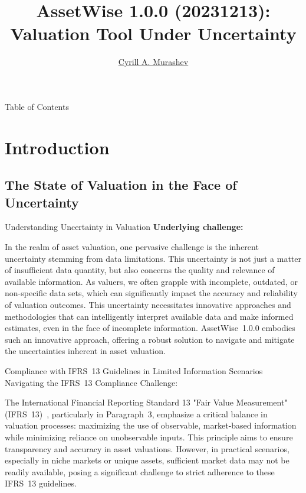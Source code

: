 \documentclass{beamer}
\title{AssetWise 1.0.0 (20231213): Valuation Tool Under Uncertainty}
\author{\href{https://github.com/Kirill-Murashev}{Cyrill A. Murashev}}
\institute{\href{https//sovconsult.tech}{Sovconsult DOO}, \href{https://en.wikipedia.org/wiki/Herceg_Novi}{Herzeg Novi}}
\begin{document}
	
\begin{frame}[plain]
    \maketitle
\end{frame}

\begin{frame}[allowframebreaks]{Table of Contents}
	\tableofcontents
\end{frame}

\section{Introduction}

\subsection{The State of Valuation in the Face of Uncertainty}

\begin{frame}{Understanding Uncertainty in Valuation}
	\textbf{Underlying challenge:}
	
	In the realm of asset valuation, one pervasive challenge is the inherent uncertainty stemming from data limitations. This uncertainty is not just a matter of insufficient data quantity, but also concerns the quality and relevance of available information. As valuers, we often grapple with incomplete, outdated, or non-specific data sets, which can significantly impact the accuracy and reliability of valuation outcomes. This uncertainty necessitates innovative approaches and methodologies that can intelligently interpret available data and make informed estimates, even in the face of incomplete information. AssetWise~1.0.0 embodies such an innovative approach, offering a robust solution to navigate and mitigate the uncertainties inherent in asset valuation.
\end{frame}

\begin{frame}{Compliance with IFRS~13 Guidelines in Limited Information Scenarios}
	Navigating the IFRS~13 Compliance Challenge:
	
	The International Financial Reporting Standard 13 "Fair Value Measurement" (IFRS~13)~\cite{IFRS-13}, particularly in Paragraph~3, emphasize a critical balance in valuation processes: maximizing the use of observable, market-based information while minimizing reliance on unobservable inputs. This principle aims to ensure transparency and accuracy in asset valuations. However, in practical scenarios, especially in niche markets or unique assets, sufficient market data may not be readily available, posing a significant challenge to strict adherence to these IFRS~13 guidelines.	
\end{frame}
\end{document}
